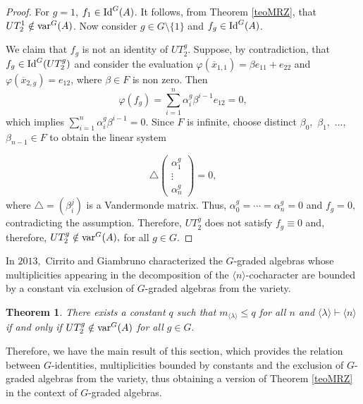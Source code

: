 \documentclass{amsart}
\newcommand{\gen}[1]{\ensuremath{\langle{#1}\rangle}}
\newcommand{\var}{\ensuremath{\textnormal{var}}}
\newcommand{\Idg}{\ensuremath{\textnormal{Id}^{G}}}
\newtheorem{teorema}{Theorem}[section]
\numberwithin{equation}{section}
\begin{document}
\begin{proof}
For $g=1$, $f_1\in \Idg(A)$. It follows, from Theorem \ref{teoMRZ}, that $UT_2^1\notin \var^G(A)$.
Now consider $g\in G\setminus \{1\}$ and $f_g\in \Idg(A)$. 

We claim that $f_g$ is not an identity of $UT_2^g$. Suppose, by contradiction, that $f_g\in \Idg(UT_2^g)$ and consider the evaluation $\varphi(\overline{x}_{1,1})=\beta e_{11}+e_{22}$ and $\varphi(\overline{x}_{2,g}) = e_{12}$, where $\beta \in F$ is non zero. Then 
$$\varphi(f_g)=\sum\limits_{i=1}^n \alpha_i^g\beta^{i-1}e_{12} = 0,$$ which implies $\sum\limits_{i=1}^n \alpha_i^g\beta^{i-1}=0. $
Since $F$ is infinite, choose distinct $\beta_0,$ $\beta_1,$ $\ldots,$ $\beta_{n-1}\in F$ to obtain the linear system 

	$$\bigtriangleup \left(\begin{array}{c} \alpha_1^g \\ \vdots \\ \alpha_{n}^g 
\end{array}\right)=0,$$
where $\bigtriangleup=(\beta_i^j)$ is a Vandermonde matrix.
	Thus, $\alpha_0^g=\cdots = \alpha_n^g=0$ and $f_g=0,$ contradicting the assumption. 
	Therefore, $UT_2^g$ does not satisfy $f_g\equiv 0$ and, therefore, $UT^{g}_{2} \notin \var^{G}(A),$ for all $g \in G.$
\end{proof}

In $2013,$ Cirrito and Giambruno \cite{GC} characterized the $G$-graded algebras whose multiplicities appearing in the decomposition of the $\langle n \rangle$-cocharacter are bounded by a constant via exclusion of $G$-graded algebras from the variety.

\begin{teorema}\cite{GC}%
\label{multexc}  There exists a constant $q$ such that $m_{\langle \lambda \rangle}\le q$ for all $n$ and $\langle \lambda \rangle \vdash \gen{n}$ if and only if $UT_2^g \notin \var^G(A)$ for all $g\in G.$
\end{teorema}

Therefore, we have the main result of this section, which provides the relation between $G$-identities, multiplicities bounded by constants and the exclusion of $G$-graded algebras from the variety, thus obtaining a version of Theorem \ref{teoMRZ} in the context of $G$-graded algebras.
\end{document}
